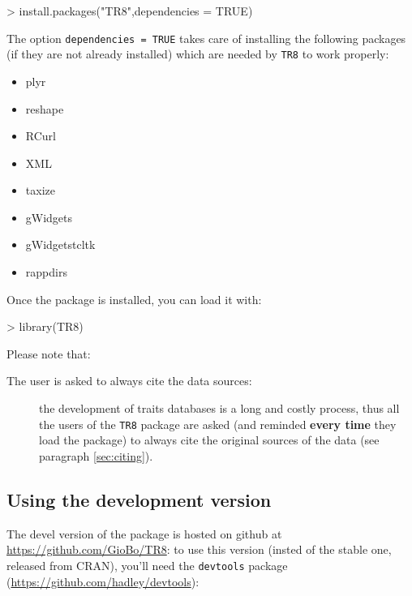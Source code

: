 \documentclass{article}
\begin{document}
\begin{Schunk}
\begin{Sinput}
> install.packages("TR8",dependencies = TRUE)
\end{Sinput}
\end{Schunk}

The option \texttt{dependencies = TRUE} takes care of installing the
following packages (if they are not already installed) which are
needed by \texttt{TR8} to work properly: 

 \begin{itemize}
  \item plyr\cite{plyr}
  \item reshape\cite{reshape}
  \item RCurl\cite{RCurl}
  \item XML\cite{XML}
  \item taxize\cite{taxize}
  \item gWidgets\cite{gWidgets}
  \item gWidgetstcltk
  \item rappdirs
  \end{itemize}
  

  
  Once the package is installed, you can load it with:

\begin{Schunk}
\begin{Sinput}
> library(TR8)
\end{Sinput}
\end{Schunk}

Please note that:

\begin{description}
\item[The user is asked to always cite the data sources: ] the
  development of traits databases is a long and costly process,
  thus all the users of the \texttt{TR8} package are asked (and
  reminded \textbf{every time} they load the package) to always cite the original sources of the data (see
  paragraph \ref{sec:citing}).
  
\end{description}

\subsection{Using the development version}

  The devel version of the package is hosted on github at \url{https://github.com/GioBo/TR8}: to use this
  version (insted of the stable one, released from CRAN), you'll need
  the \texttt{devtools} package (\url{https://github.com/hadley/devtools}):
  
\end{document}
